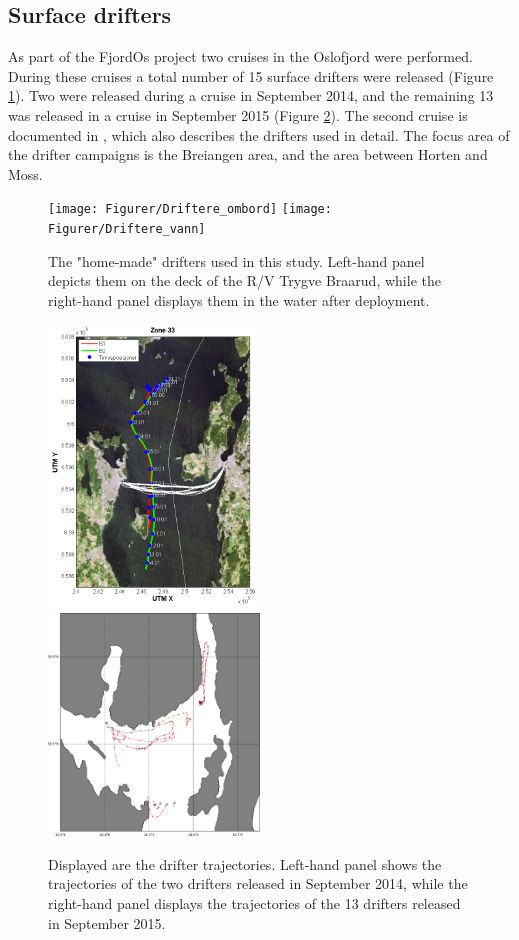 \newpage
\subsection{Surface drifters}
As part of the FjordOs project two cruises in the Oslofjord were performed. During these cruises a total number of 15 surface drifters were released (Figure \ref{fig:drifters_design}). Two were released during a cruise in September 2014, and the remaining 13 was released in a cruise in September 2015 (Figure \ref{fig:drifters_tracks}). The second cruise is documented in \cite{hjelm:etal:2016}, which also describes the drifters used in detail. The focus area of the drifter campaigns is the Breiangen area, and the area between Horten and Moss.

\begin{figure}[ht]
\centerline{
\texttt{[image: Figurer/Driftere\_ombord]}
\texttt{[image: Figurer/Driftere\_vann]}
}
\caption{\small
The "home-made" drifters used in this study. Left-hand panel depicts them on the deck of the R/V Trygve Braarud, while the right-hand panel displays them in the water after deployment.}
\label{fig:drifters_design}
\end{figure}

\begin{figure}[ht]
\centerline{
\includegraphics*[width=0.5\textwidth]{Figurer/drifters_sept2014}
\includegraphics*[width=0.5\textwidth]{Figurer/drifters_low_crop}
}
\caption{\small
Displayed are the drifter trajectories. Left-hand panel shows the trajectories of the two drifters released in September 2014, while the right-hand panel displays the trajectories of the 13 drifters released in September 2015.}
\label{fig:drifters_tracks}
\end{figure}

